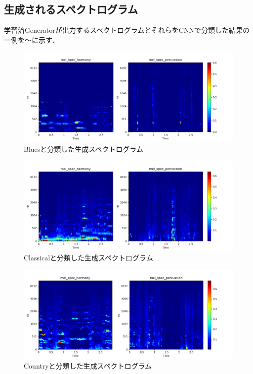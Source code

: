 \subsection{生成されるスペクトログラム}
学習済Generatorが出力するスペクトログラムとそれらをCNNで分類した結果の一例を～に示す．
\begin{figure}[htbp]
	\begin{center}
		\includegraphics[scale=0.58]{./images/generate-model/gen-blues.png}
		\caption{Bluesと分類した生成スペクトログラム}
		\label{fig:generate-blues}
	\end{center}
\end{figure}
\begin{figure}[htbp]
	\begin{center}
		\includegraphics[scale=0.51]{./images/generate-model/gen-classical.png}
		\caption{Classicalと分類した生成スペクトログラム}
		\label{fig:generate-classical}
	\end{center}
\end{figure}
\begin{figure}[htbp]
	\begin{center}
		\includegraphics[scale=0.51]{./images/generate-model/gen-country.png}
		\caption{Countryと分類した生成スペクトログラム}
		\label{fig:generate-country}
	\end{center}
\end{figure}
